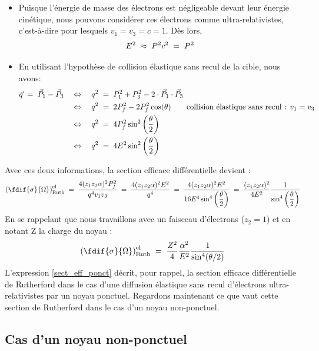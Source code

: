 \begin{itemize}

    \item Puisque l'énergie de masse des électrons est négligeable devant leur énergie cinétique, nous pouvons considérer ces électrons comme ultra-relativistes, c'est-à-dire pour lesquels $v_1=v_3=c=1$. Dès lors,
    \[
        E^2 \;\approx\; P^2c^2 \; = \; P^2
    \]
    
    \item En utilisant l'hypothèse de collision élastique sans recul de la cible, nous avons:
    \begin{align*}
        \vec{q} \; = \; \vec{P}_1 - \vec{P}_3
            &\quad \Leftrightarrow \quad
        q^2 \; = \; P_1^2 + P_3^2 - 2 \cdot \vec{P}_1 \cdot \vec{P}_3\\
            &\quad \Leftrightarrow \quad
        q^2 \; = \; 2 P_f^2 - 2 P_f^2 \cos(\theta)
        \qquad \text{collision élastique sans recul : } v_1=v_3\\
            &\quad \Leftrightarrow \quad
        q^2 \; = \; 4 P_f^2 \sin^2\left(\dfrac{\theta}{2}\right)\\
            &\quad \Leftrightarrow \quad
        q^2 \; = \; 4 E^2   \sin^2\left(\dfrac{\theta}{2}\right)
    \end{align*}
\end{itemize}
Avec ces deux informations, la section efficace différentielle devient :
\[
    \left(  \fdif{\sigma}{\Omega}  \right)^\text{el}_\text{Ruth}
    \eq
    \dfrac{4 (z_1 z_2 \alpha)^2 P_f^2}{q^4v_1v_3}
    \eq
    \dfrac{4 (z_1 z_2 \alpha)^2 E^2}{q^4}
    \eq
    \dfrac{4 (z_1 z_2 \alpha)^2 E^2}{16 E^4 \sin^4\left(\dfrac{\theta}{2}\right)}
    \eq
    \dfrac{(z_1 z_2 \alpha)^2}{4E^2}
    \dfrac{1}{\sin^4\left(\dfrac{\theta}{2}\right)}
\]
En se rappelant que nous travaillons avec un faisceau d'électrons ($z_2 = 1$) et en notant Z la charge du noyau : 
\begin{equation}
    \left(  \fdif{\sigma}{\Omega}  \right)^\text{el}_\text{Ruth}
    \eq
    \dfrac{Z^2}{4}\dfrac{\alpha^2}{E^2}\dfrac{1}{\sin^4(\theta/2)}
    \label{sect_eff_ponct}
\end{equation}
L'expression \ref{sect_eff_ponct} décrit, pour rappel, la section efficace différentielle de Rutherford dans le cas d'une diffusion élastique sans recul d'électrons ultra-relativistes par un noyau ponctuel. Regardons maintenant ce que vaut cette section de Rutherford dans le cas d'un noyau non-ponctuel.


\subsection{Cas d'un noyau non-ponctuel}\label{sec:noyau_non_ponctuel}


